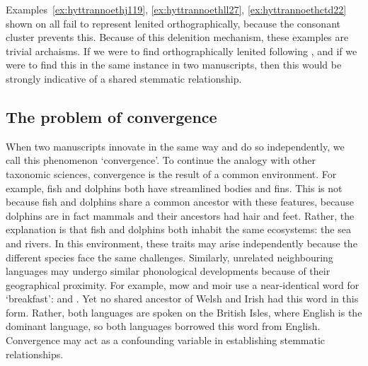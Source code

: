 Examples~\ref{ex:hyttrannoethj119}, \ref{ex:hyttrannoethll27}, \ref{ex:hyttrannoethctd22} shown on  all fail to represent lenited  orthographically, because the  consonant cluster prevents this. Because of this delenition mechanism, these examples are trivial archaisms. If we were to find orthographically lenited  following , and if we were to find this in the same instance in two manuscripts, then this would be strongly indicative of a shared stemmatic relationship.


\subsection{The problem of convergence}
\label{sec:problem-convergence}

When two manuscripts innovate in the same way and do so independently, we  call this phenomenon `convergence'. To continue the analogy with other taxonomic sciences, convergence is the result of a common environment. For example, fish and dolphins both have streamlined bodies and fins. This is not because fish and dolphins share a common ancestor with these features, because dolphins are in fact mammals and their ancestors had hair and feet. Rather, the explanation is that fish and dolphins both inhabit the same ecosystems: the sea and rivers. In this environment, these traits may arise independently because the different species face the same challenges. Similarly, unrelated neighbouring languages may undergo similar phonological developments because of their geographical proximity. For example, \gls{mow} and \gls{moir} use a near-identical word for `breakfast':  and . Yet no shared ancestor of Welsh and Irish had this word in this form. Rather, both languages are spoken on the British Isles, where English is the dominant language, so both languages borrowed this word from English. Convergence may act as a confounding variable in establishing stemmatic relationships.

